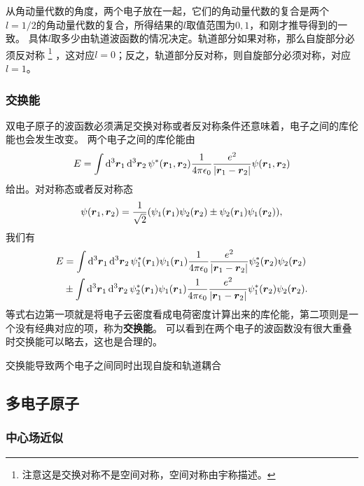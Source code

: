 \documentclass[UTF8, a4paper]{ctexart}
\begin{document}
从角动量代数的角度，两个电子放在一起，它们的角动量代数的复合是两个$l=1/2$的角动量代数的复合，所得结果的$l$取值范围为$0, 1$，和刚才推导得到的一致。
具体$l$取多少由轨道波函数的情况决定。轨道部分如果对称，那么自旋部分必须反对称%
\footnote{注意这是交换对称不是空间对称，空间对称由宇称描述。}%
，这对应$l=0$；反之，轨道部分反对称，则自旋部分必须对称，对应$l=1$。

\subsubsection{交换能}

双电子原子的波函数必须满足交换对称或者反对称条件还意味着，电子之间的库伦能也会发生改变。
两个电子之间的库伦能由
\begin{equation}
    E = \int \dd[3]{\vb*{r}_1} \dd[3]{\vb*{r}_2} \psi^*(\vb*{r}_1, \vb*{r}_2) \frac{1}{4\pi \epsilon_0} \frac{e^2}{\abs{\vb*{r}_1 - \vb*{r}_2}} \psi(\vb*{r}_1, \vb*{r}_2)
\end{equation}
给出。对对称态或者反对称态
\[
    \psi(\vb*{r}_1, \vb*{r}_2) = \frac{1}{\sqrt{2}} (\psi_1(\vb*{r}_1) \psi_2(\vb*{r}_2) \pm \psi_2(\vb*{r}_1) \psi_1(\vb*{r}_2)),
\]
我们有
\begin{equation}
    \begin{aligned}
        E &= \int \dd[3]{\vb*{r}_1} \dd[3]{\vb*{r}_2} \psi_1^*(\vb*{r}_1) \psi_1(\vb*{r}_1) \frac{1}{4\pi \epsilon_0} \frac{e^2}{\abs{\vb*{r}_1 - \vb*{r}_2}} \psi_2^*(\vb*{r}_2) \psi_2(\vb*{r}_2) \\
        &\pm \int \dd[3]{\vb*{r}_1} \dd[3]{\vb*{r}_2} \psi_2^*(\vb*{r}_1) \psi_1(\vb*{r}_1) \frac{1}{4\pi \epsilon_0} \frac{e^2}{\abs{\vb*{r}_1 - \vb*{r}_2}} \psi_1^*(\vb*{r}_2) \psi_2(\vb*{r}_2).
    \end{aligned}
\end{equation}
等式右边第一项就是将电子云密度看成电荷密度计算出来的库伦能，第二项则是一个没有经典对应的项，称为\textbf{交换能}。
可以看到在两个电子的波函数没有很大重叠时交换能可以略去，这也是合理的。

交换能导致两个电子之间同时出现自旋和轨道耦合

\subsection{多电子原子}

\subsubsection{中心场近似}
\end{document}
